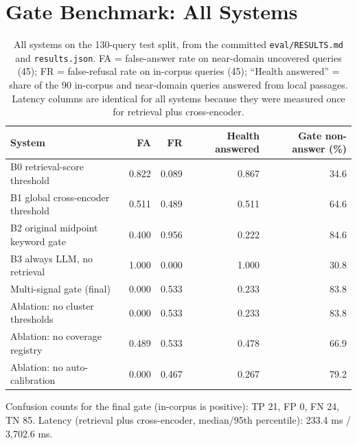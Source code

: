 \documentclass[10pt,a4paper]{article}
\newcommand{\code}[1]{\texttt{\small #1}}
\begin{document}
\section{Gate Benchmark: All Systems}\label{app:gate}
\begin{table}[h]
\centering\small
\caption{All systems on the 130-query test split, from the committed \code{eval/RESULTS.md} and \code{results.json}. FA = false-answer rate on near-domain uncovered queries (45); FR = false-refusal rate on in-corpus queries (45); ``Health answered'' = share of the 90 in-corpus and near-domain queries answered from local passages. Latency columns are identical for all systems because they were measured once for retrieval plus cross-encoder.}
\begin{tabular}{lrrrr}
\toprule
System & FA & FR & Health answered & Gate non-answer (\%)\\
\midrule
B0 retrieval-score threshold & 0.822 & 0.089 & 0.867 & 34.6\\
B1 global cross-encoder threshold & 0.511 & 0.489 & 0.511 & 64.6\\
B2 original midpoint keyword gate & 0.400 & 0.956 & 0.222 & 84.6\\
B3 always LLM, no retrieval & 1.000 & 0.000 & 1.000 & 30.8\\
Multi-signal gate (final) & 0.000 & 0.533 & 0.233 & 83.8\\
\; Ablation: no cluster thresholds & 0.000 & 0.533 & 0.233 & 83.8\\
\; Ablation: no coverage registry & 0.489 & 0.533 & 0.478 & 66.9\\
\; Ablation: no auto-calibration & 0.000 & 0.467 & 0.267 & 79.2\\
\bottomrule
\end{tabular}
\end{table}
Confusion counts for the final gate (in-corpus is positive): TP 21, FP 0, FN 24, TN 85. Latency (retrieval plus cross-encoder, median/95th percentile): 233.4 ms / 3,702.6 ms.
\end{document}
